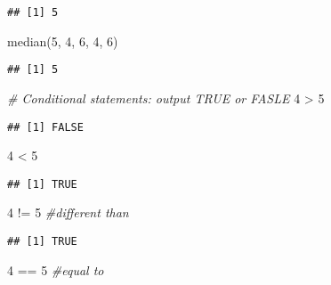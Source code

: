 \documentclass[
]{article}
\newenvironment{Shaded}{\begin{snugshade}}{\end{snugshade}}
\newcommand{\CommentTok}[1]{\textcolor[rgb]{0.56,0.35,0.01}{\textit{#1}}}
\newcommand{\DecValTok}[1]{\textcolor[rgb]{0.00,0.00,0.81}{#1}}
\newcommand{\FunctionTok}[1]{\textcolor[rgb]{0.00,0.00,0.00}{#1}}
\newcommand{\NormalTok}[1]{#1}
\newcommand{\SpecialCharTok}[1]{\textcolor[rgb]{0.00,0.00,0.00}{#1}}
\begin{document}
\begin{verbatim}
## [1] 5
\end{verbatim}

\begin{Shaded}
\begin{Highlighting}[]
\FunctionTok{median}\NormalTok{(}\DecValTok{5}\NormalTok{, }\DecValTok{4}\NormalTok{, }\DecValTok{6}\NormalTok{, }\DecValTok{4}\NormalTok{, }\DecValTok{6}\NormalTok{)}
\end{Highlighting}
\end{Shaded}

\begin{verbatim}
## [1] 5
\end{verbatim}

\begin{Shaded}
\begin{Highlighting}[]
\CommentTok{\# Conditional statements: output TRUE or FASLE}
\DecValTok{4} \SpecialCharTok{\textgreater{}} \DecValTok{5}
\end{Highlighting}
\end{Shaded}

\begin{verbatim}
## [1] FALSE
\end{verbatim}

\begin{Shaded}
\begin{Highlighting}[]
\DecValTok{4} \SpecialCharTok{\textless{}} \DecValTok{5}
\end{Highlighting}
\end{Shaded}

\begin{verbatim}
## [1] TRUE
\end{verbatim}

\begin{Shaded}
\begin{Highlighting}[]
\DecValTok{4} \SpecialCharTok{!=} \DecValTok{5} \CommentTok{\#different than}
\end{Highlighting}
\end{Shaded}

\begin{verbatim}
## [1] TRUE
\end{verbatim}

\begin{Shaded}
\begin{Highlighting}[]
\DecValTok{4} \SpecialCharTok{==} \DecValTok{5} \CommentTok{\#equal to}
\end{Highlighting}
\end{Shaded}
\end{document}
